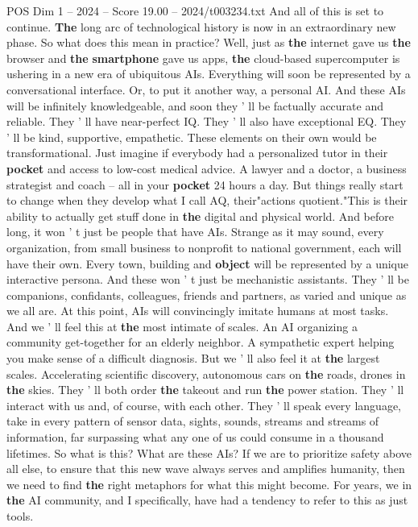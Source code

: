 \begin{textsample}{POS Dim 1 – 2024 – Score 19.00 – 2024/t003234.txt}
And all of this is set to continue. \textbf{The} long arc of technological history is now in an extraordinary new phase.
So what does this mean in practice?
Well, just as \textbf{the} internet gave us \textbf{the} browser and \textbf{the} \textbf{smartphone} gave us apps, \textbf{the} cloud-based supercomputer is ushering in a new era of ubiquitous AIs.
Everything will soon be represented by a conversational interface.
Or, to put it another way, a personal AI.
And these AIs will be infinitely knowledgeable, and soon they ' ll be factually accurate and reliable.
They ' ll have near-perfect IQ.
They ' ll also have exceptional EQ.
They ' ll be kind, supportive, empathetic.
These elements on their own would be transformational.
Just imagine if everybody had a personalized tutor in their \textbf{pocket} and access to low-cost medical advice.
A lawyer and a doctor, a business strategist and coach -- all in your \textbf{pocket} 24 hours a day.
But things really start to change when they develop what I call AQ, their"actions quotient."This is their ability to actually get stuff done in \textbf{the} digital and physical world.
And before long, it won ' t just be people that have AIs.
Strange as it may sound, every organization, from small business to nonprofit to national government, each will have their own.
Every town, building and \textbf{object} will be represented by a unique interactive persona.
And these won ' t just be mechanistic assistants.
They ' ll be companions, confidants, colleagues, friends and partners, as varied and unique as we all are.
At this point, AIs will convincingly imitate humans at most tasks.
And we ' ll feel this at \textbf{the} most intimate of scales.
An AI organizing a community get-together for an elderly neighbor.
A sympathetic expert helping you make sense of a difficult diagnosis.
But we ' ll also feel it at \textbf{the} largest scales.
Accelerating scientific discovery, autonomous cars on \textbf{the} roads, drones in \textbf{the} skies.
They ' ll both order \textbf{the} takeout and run \textbf{the} power station.
They ' ll interact with us and, of course, with each other.
They ' ll speak every language, take in every pattern of sensor data, sights, sounds, streams and streams of information, far surpassing what any one of us could consume in a thousand lifetimes.
So what is this?
What are these AIs?
If we are to prioritize safety above all else, to ensure that this new wave always serves and amplifies humanity, then we need to find \textbf{the} right metaphors for what this might become.
For years, we in \textbf{the} AI community, and I specifically, have had a tendency to refer to this as just tools.

\end{textsample}

